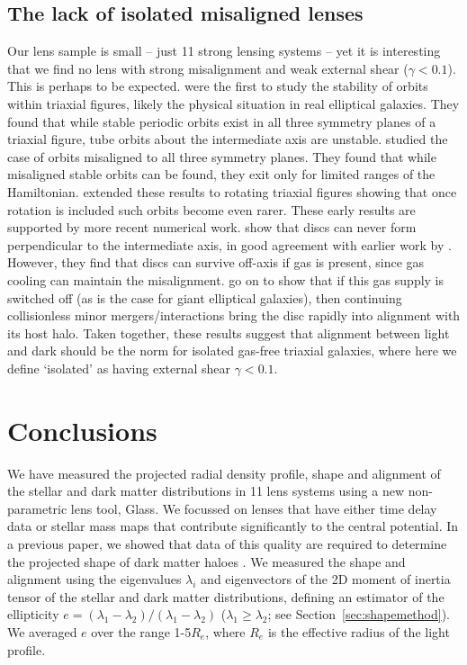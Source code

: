 \documentclass[useAMS,usenatbib]{mn2e}
\def\Glass{{\sc Glass}}
\begin{document}
\subsection{The lack of isolated misaligned lenses}
Our lens sample is small -- just 11 strong lensing systems -- yet it is interesting that we find no lens with strong misalignment and weak external shear ($\gamma < 0.1$). This is perhaps to be expected. \citet{1979ApJ...233..872H} were the first to study the stability of orbits within triaxial figures, likely the physical situation in real elliptical galaxies. They found that while stable periodic orbits exist in all three symmetry planes of a triaxial figure, tube orbits about the intermediate axis are unstable. \citet{1985MNRAS.215..731D} studied the case of orbits misaligned to all three symmetry planes. They found that while misaligned stable orbits can be found, they exit only for limited ranges of the Hamiltonian. \citet{1988A&A...206..269M} extended these results to rotating triaxial figures showing that once rotation is included such orbits become even rarer. These early results are supported by more recent numerical work. \citet{2013MNRAS.434.2971D} show that discs can never form perpendicular to the intermediate axis, in good agreement with earlier work by \citet{1979ApJ...233..872H}. However, they find that discs can survive off-axis if gas is present, since gas cooling can maintain the misalignment. \citet{2015MNRAS.452.4094D} go on to show that if this gas supply is switched off (as is the case for giant elliptical galaxies), then continuing collisionless minor mergers/interactions bring the disc rapidly into alignment with its host halo. Taken together, these results suggest that alignment between light and dark should be the norm for isolated gas-free triaxial galaxies, where here we define `isolated' as having external shear $\gamma < 0.1$.

\section{Conclusions}\label{sec:conclusions}
We have measured the projected radial density profile, shape and alignment of the stellar and dark matter distributions in 11 lens systems using a new non-parametric lens tool, \Glass. We focussed on lenses that have either time delay data or stellar mass maps that contribute significantly to the central potential. In a previous paper, we showed that data of this quality are required to determine the projected shape of dark matter haloes \citep{2014MNRAS.445.2181C}. We measured the shape and alignment using the eigenvalues $\lambda_i$ and eigenvectors of the 2D moment of inertia tensor of the stellar and dark matter distributions, defining an estimator of the ellipticity $e = (\lambda_{1}-\lambda_{2})/(\lambda_{1}-\lambda_{2})$ ($\lambda_{1} \geq \lambda_{2}$; see Section~\ref{sec:shapemethod}). We averaged $e$ over the range 1-5$R_e$, where $R_e$ is the effective radius of the light profile.
\end{document}
